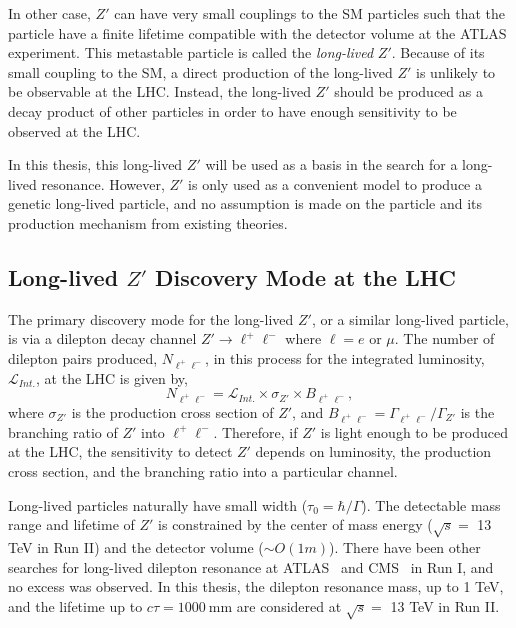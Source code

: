 In other case, $Z'$ can have very small couplings to the SM particles such that the particle have a finite lifetime compatible with the detector volume at the ATLAS experiment. This metastable particle is called the \textit{long-lived} $Z'$. Because of its small coupling to the SM, a direct production of the long-lived $Z'$ is unlikely to be observable at the LHC. Instead, the long-lived $Z'$ should be produced as a decay product of other particles in order to have enough sensitivity to be observed at the LHC. 

In this thesis, this long-lived $Z'$ will be used as a basis in the search for a long-lived resonance. However, $Z'$ is only used as a convenient model to produce a genetic long-lived particle, and no assumption is made on the particle and its production mechanism from existing theories.


\subsection{Long-lived \texorpdfstring{$Z'$}{Z'} Discovery Mode at the LHC}
\label{sec:intro:zprime_discovery}

The primary discovery mode for the long-lived $Z'$, or a similar long-lived particle, is via a dilepton decay channel $Z' \rightarrow  \ell^{+}\ell^{-}$ where $\ell= e$ or $\mu$. The number of dilepton pairs produced, $N_{\ell^{+}\ell^{-}}$, in this process for the integrated luminosity, $\mathcal{L}_{Int.}$, at the LHC is given by,
%
\begin{equation}
\label{eq:cross_section}
N_{\ell^{+}\ell^{-}} = \mathcal{L}_{Int.} \times \sigma_{Z'} \times B_{\ell^{+}\ell^{-}},
\end{equation}
%
where $\sigma_{Z'}$ is the production cross section of $Z'$, and $B_{\ell^{+}\ell^{-}} = \Gamma_{\ell^{+}\ell^{-}} / \Gamma_{Z'}$ is the branching ratio of $Z'$ into $\ell^{+}\ell^{-}$. Therefore, if $Z'$ is light enough to be produced at the LHC, the sensitivity to detect $Z'$ depends on luminosity, the production cross section, and the branching ratio into a particular channel.

Long-lived particles naturally have small width ($\tau_{0} = \hbar / \Gamma$). The detectable mass range and lifetime of $Z'$ is constrained by the center of mass energy ($\sqrt{s} = $ 13 TeV in Run II) and the detector volume ($\sim O(1m)$). There have been other searches for long-lived dilepton resonance at ATLAS~\cite{Aad:2010949} and CMS~\cite{Chatrchyan:1493239} in Run I, and no excess was observed. In this thesis, the dilepton resonance mass, up to 1 TeV, and the lifetime up to $c\tau= 1000~\si{\mm}$ are considered at $\sqrt{s}=$ 13 TeV in Run II.

